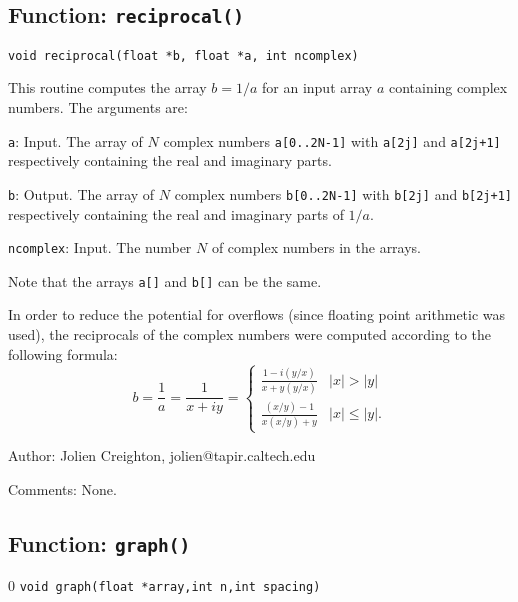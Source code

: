 \subsection{Function: \texttt{reciprocal()}}
\label{ss:reciprocal}

\begin{verbatim}
void reciprocal(float *b, float *a, int ncomplex)
\end{verbatim}

This routine computes the array $b=1/a$ for an input array $a$ containing
complex numbers.  The arguments are:
\begin{description}
\item{\texttt{a}}: Input.  The array of $N$ complex numbers
  \texttt{a[0..2N-1]} with \texttt{a[2j]} and \texttt{a[2j+1]} respectively
  containing the real and imaginary parts.
\item{\texttt{b}}: Output.  The array of $N$ complex numbers
  \texttt{b[0..2N-1]} with \texttt{b[2j]} and \texttt{b[2j+1]} respectively
  containing the real and imaginary parts of $1/a$.
\item{\texttt{ncomplex}}: Input.  The number $N$ of complex numbers in the
  arrays.
\end{description}
Note that the arrays \texttt{a[]} and \texttt{b[]} can be the same.

In order to reduce the potential for overflows
(since floating point arithmetic was used), the reciprocals of the
complex numbers were computed according to the following formula:
\begin{equation}
  b = \frac{1}{a} = \frac{1}{x+iy} = \left\{
  \begin{array}{ll}
     \displaystyle\frac{1-i(y/x)}{x+y(y/x)} & |x|>|y| \\[12pt]
     \displaystyle \frac{(x/y)-1}{x(x/y)+y}  & |x|\le|y|.
  \end{array}
  \right.
\end{equation}

\begin{description}
\item{Author:} Jolien Creighton, jolien@tapir.caltech.edu
\item{Comments:} None.
\end{description}
\clearpage

\subsection{Function: {\tt graph()}}
\setcounter{equation}0
{\tt void graph(float *array,int n,int spacing)}


